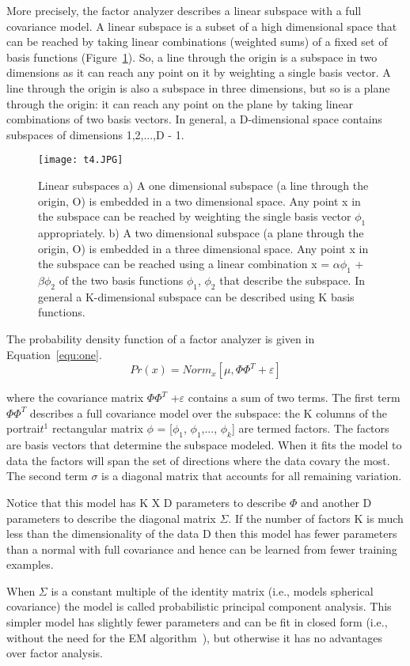\documentclass[10pt,twocolumn,letterpaper]{article}
\begin{document}
More precisely, the factor analyzer describes a linear subspace with a full covariance model. A linear subspace is a subset of a high dimensional space that can be reached by taking linear combinations (weighted sums) of a fixed set of basis functions (Figure~\ref{fig:onecol}). So, a line through the origin is a subspace in two dimensions as it can reach any point on it by weighting a single basis vector. A line through the origin is also a subspace in three dimensions, but so is a plane through the origin: it can reach any point on the plane by taking linear combinations of two basis vectors. In general, a D-dimensional space contains subspaces of dimensions 1,2,...,D - 1.
\begin{figure}[H]
\centering
\texttt{[image: t4.JPG]}
 \caption{Linear subspaces a) A one dimensional subspace (a line through the origin, O) is embedded in a two dimensional space. Any point x in the subspace can be reached by weighting the single basis vector $\phi_1$ appropriately. b) A two dimensional subspace (a plane through the origin, O) is embedded in a three dimensional space. Any point x in the subspace can be reached using a linear combination x = $\alpha\phi_1$ + $\beta\phi_2$ of the two basis functions $\phi_1$, $\phi_2$ that describe the subspace. In general a K-dimensional subspace can be described using K basis functions.}
\label{fig:onecol}
\end{figure}

The probability density function of a factor analyzer is given in Equation~\ref{equ:one}.
\begin{equation}\label{equ:one}
Pr(x) = Norm_x[\mu, \Phi\Phi^T +\varepsilon]
\end{equation}

where the covariance matrix $\Phi$$\Phi^T$ +$\varepsilon$ contains a sum of two terms. The first term $\Phi$$\Phi^T$ describes a full covariance model over the subspace: the K columns of the portrai$t^1$ rectangular matrix $\phi$ = [$\phi_1$, $\phi_1$,..., $\phi_k$] are termed factors. The factors are basis vectors that determine the subspace modeled. When it fits the model to data the factors will span the set of directions where the data covary the most. The second term $\sigma$ is a diagonal matrix that accounts for all remaining variation.

Notice that this model has K X D parameters to describe $\Phi$ and another D parameters to describe the diagonal matrix $\Sigma$. If the number of factors K is much less than the dimensionality of the data D then this model has fewer parameters than a normal with full covariance and hence can be learned from fewer training examples.

When $\Sigma$ is a constant multiple of the identity matrix (i.e., models spherical covariance) the model is called probabilistic principal component analysis. This simpler model has slightly fewer parameters and can be fit in closed form (i.e., without the need for the EM algorithm~\cite{DebashisKushary1997The}), but otherwise it has no advantages over factor analysis.


{\small


}
\end{document}
